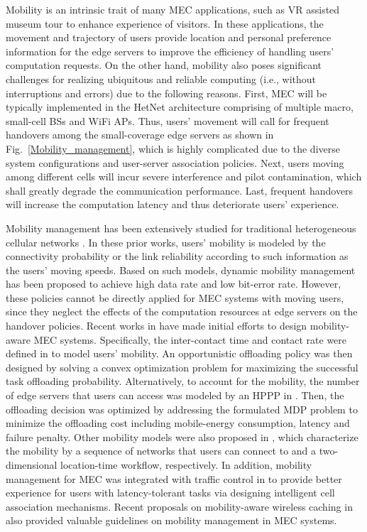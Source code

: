 \documentclass[journal]{IEEEtran}
\begin{document}
{Mobility is an intrinsic trait of many MEC applications, such as VR assisted museum tour to enhance experience of visitors. In these applications, the movement and trajectory of users provide location and personal preference information for the edge servers to improve the efficiency of handling users' computation requests. On the other hand, mobility also poses significant challenges for realizing ubiquitous and reliable computing (i.e., without interruptions and errors) due to the following reasons. First, MEC will be typically implemented in the HetNet architecture comprising of multiple macro, small-cell BSs and WiFi APs. Thus, users' movement will call for frequent handovers among the small-coverage edge servers as shown in Fig.~\ref{Mobility_management}, which is highly complicated due to the diverse system configurations and user-server association policies. Next, users moving among different cells will incur severe interference and pilot contamination, which shall greatly degrade the communication performance. Last, frequent handovers will increase the computation latency and thus deteriorate users' experience.

Mobility management has been extensively studied for traditional heterogeneous cellular networks \cite{lopez2012mobility,damnjanovic2011survey,kassar2008overview}. In these prior works, users' mobility is modeled by the connectivity probability or the link reliability according to such information as the users' moving speeds. Based on such models, dynamic mobility management has been proposed to achieve high data rate and low bit-error rate. However, these policies cannot be directly applied for MEC systems with moving users, since they neglect the effects of the computation resources at edge servers on the handover policies. Recent works in \cite{wangCZ2014mobility,zhang2015offloading,lee2015user,rahimi2013music} have made initial efforts to design mobility-aware MEC systems. Specifically, the inter-contact time and contact rate were defined in \cite{wangCZ2014mobility} to model users' mobility. An opportunistic offloading policy was then designed by solving a convex optimization problem for maximizing the successful task offloading probability. Alternatively, to account for the mobility, the number of edge servers that users can access  was modeled by an HPPP in \cite{zhang2015offloading}. Then, the offloading decision was optimized by addressing the formulated MDP problem to minimize the offloading cost including mobile-energy consumption, latency and failure penalty. Other mobility models were also proposed in \cite{lee2015user,rahimi2013music}, which characterize the mobility by a sequence of networks that users can connect to and a two-dimensional location-time workflow, respectively. In addition, mobility management for MEC was integrated with traffic control in \cite{prasad2015efficient} to provide better experience for users with latency-tolerant tasks via designing intelligent cell association mechanisms. {} Recent proposals on mobility-aware wireless caching in \cite{wang2016mobility} also provided valuable guidelines on mobility management in MEC systems.

}
\end{document}
